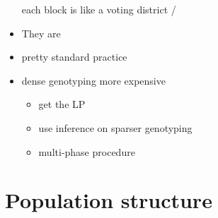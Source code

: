 \documentclass[font=12pt]{article}
\begin{document}
\begin{itemize}
	each block is like a voting district / 
	\item They are 
	\item pretty standard practice
	\item dense genotyping more expensive 
	\begin{itemize}
		\item get the LP
		\item use inference on sparser genotyping 
		\item multi-phase procedure
	\end{itemize}
\end{itemize}

\newpage
\section{Population structure}
\end{document}

